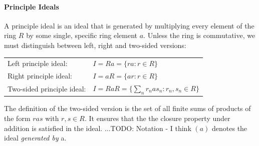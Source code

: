 
%

\paragraph{Principle Ideals} A principle ideal is an ideal that is generated by multiplying every element of the ring $R$ by some single, specific ring element $a$. Unless the ring is commutative, we must distinguish between left, right and two-sided versions:

\medskip
\begin{tabular}{l l}
Left principle ideal:      & $I = R a = \{ r a : r \in R \}$ \\
Right principle ideal:     & $I = a R = \{ a r : r \in R \}$ \\
Two-sided principle ideal: & $I = RaR = \{ \sum_n r_n a s_n : r_n,s_n \in R \} $ \\
\end{tabular}
\medskip

The definition of the two-sided version is the set of all finite sums of products of the form $r a s$ with $r,s \in R$. It ensures that the the closure property under addition is satisfied in the ideal.%
...TODO: Notation - I think $(a)$ denotes the ideal \emph{generated by} a. 










